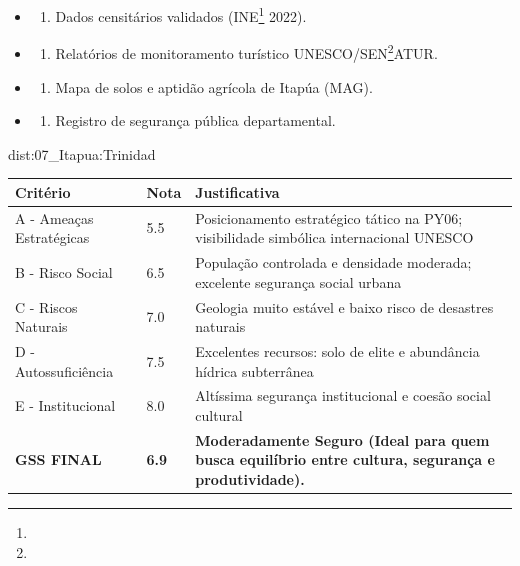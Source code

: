 {\begin{itemize}
\tightlist
\item
  \begin{enumerate}
  \def\labelenumi{\arabic{enumi})}
  \tightlist
  \item
    Dados censitários validados (INE\footnote{\fineINE} 2022).
  \end{enumerate}
\item
  \begin{enumerate}
  \def\labelenumi{\arabic{enumi})}
  \setcounter{enumi}{1}
  \tightlist
  \item
    Relatórios de monitoramento turístico UNESCO/\allowbreak SEN\footnote{\fineSEN}ATUR.
  \end{enumerate}
\item
  \begin{enumerate}
  \def\labelenumi{\arabic{enumi})}
  \setcounter{enumi}{2}
  \tightlist
  \item
    Mapa de solos e aptidão agrícola de Itapúa (MAG).
  \end{enumerate}
\item
  \begin{enumerate}
  \def\labelenumi{\arabic{enumi})}
  \setcounter{enumi}{3}
  \tightlist
  \item
    Registro de segurança pública departamental.
  \end{enumerate}
\end{itemize}}{dist:07_Itapua:Trinidad}
\begin{table}[ht!]
\small \begin{tabular}{p{3.0cm}p{0.8cm}p{6.0cm}} \toprule
\textbf{Critério} & \textbf{Nota} & \textbf{Justificativa} \\ \midrule
A - Ameaças Estratégicas & 5.5 & Posicionamento estratégico tático na PY06; visibilidade simbólica internacional UNESCO \\
B - Risco Social & 6.5 & População controlada e densidade moderada; excelente segurança social urbana \\
C - Riscos Naturais & 7.0 & Geologia muito estável e baixo risco de desastres naturais \\
D - Autossuficiência & 7.5 & Excelentes recursos: solo de elite e abundância hídrica subterrânea \\
E - Institucional & 8.0 & Altíssima segurança institucional e coesão social cultural \\
\midrule \textbf{GSS FINAL} & \textbf{6.9} & \textbf{Moderadamente Seguro (Ideal para quem busca equilíbrio entre cultura, segurança e produtividade).} \\ \bottomrule \end{tabular}
\end{table}

